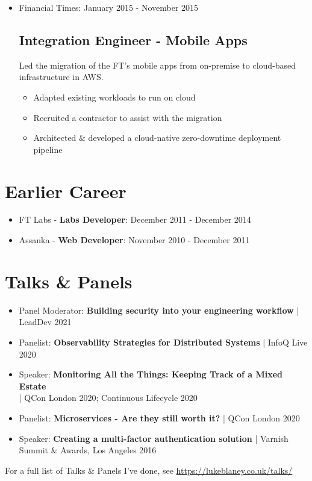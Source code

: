 \documentclass[a4paper]{article}
\newenvironment{detail}{\begin{adjustwidth}{10pt}{}}{\end{adjustwidth}}
\begin{document}
\begin{itemize}
\item Financial Times: January 2015 - November 2015
\subsection*{Integration Engineer - Mobile Apps}
\begin{detail}
Led the migration of the FT's mobile apps from on-premise to cloud-based infrastructure in AWS.
\begin{itemize}
	\item Adapted existing workloads to run on cloud
	\item Recruited a contractor to assist with the migration
	\item Architected \& developed a cloud-native zero-downtime deployment pipeline
\end{itemize}
\end{detail}

\end{itemize}

\section*{Earlier Career}
\begin{itemize}

\item FT Labs - {\bf Labs Developer}: December 2011 - December 2014
\item Assanka - {\bf Web Developer}: November 2010 - December 2011

\end{itemize}

\pagebreak

\section*{Talks \& Panels}
\begin{itemize}

\item Panel Moderator: {\bf Building security into your engineering workflow} | LeadDev 2021
\item Panelist: {\bf Observability Strategies for Distributed Systems} | InfoQ Live 2020
\item Speaker: {\bf Monitoring All the Things: Keeping Track of a Mixed Estate}\\ | QCon London 2020; Continuous Lifecycle 2020
\item Panelist: {\bf Microservices - Are they still worth it?} | QCon London 2020
\item Speaker: {\bf Creating a multi-factor authentication solution} | Varnish Summit \& Awards, Los Angeles 2016
\end{itemize}
For a full list of Talks \& Panels I've done, see \url{https://lukeblaney.co.uk/talks/}
\end{document}
